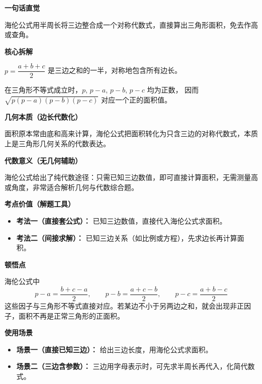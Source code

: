 \begin{explanationbox}
	\textbf{\textcolor{CExplanation}{一句话直觉}}

	海伦公式用半周长将三边整合成一个对称代数式，直接算出三角形面积，免去作高或查角。

	\medskip
	\textbf{\textcolor{CExplanation}{核心拆解}}

	\begin{description}[style=nextline, leftmargin=2.8em, labelsep=0.5em, itemsep=0.45em]
		\item[\textbf{要点一（半周长运算）：}]
		      $p = \dfrac{a+b+c}{2}$ 是三边之和的一半，对称地包含所有边长。

		\item[\textbf{要点二（根号乘积）：}]
		      在三角形不等式成立时，$p$, $p-a$, $p-b$, $p-c$ 均为正数，
		      因而 $\sqrt{p(p-a)(p-b)(p-c)}$ 对应一个正的面积值。
	\end{description}

	\medskip
	\textbf{\textcolor{CExplanation}{几何本质（边长代数化）}}

	面积原本常由底和高来计算，海伦公式把面积转化为只含三边的对称代数式，本质上是三角形几何关系的代数表达。

	\medskip
	\textbf{\textcolor{CExplanation}{代数意义（无几何辅助）}}

	海伦公式给出了纯代数途径：只需已知三边数值，即可直接计算面积，无需测量高或角度，非常适合解析几何与代数综合题。

	\medskip
	\textbf{\textcolor{CExplanation}{考点价值（解题工具）}}

	\begin{itemize}[leftmargin=*, itemsep=0.5em, topsep=0.4em]
		\item \textbf{考法一（直接套公式）：} 已知三边数值，直接代入海伦公式求面积。
		\item \textbf{考法二（间接求解）：} 已知三边关系（如比例或方程），先求边长再计算面积。
	\end{itemize}

	\medskip
	\textbf{\textcolor{CExplanation}{顿悟点}}

	海伦公式中
	\[
		p-a = \frac{b+c-a}{2},
		\qquad
		p-b = \frac{a+c-b}{2},
		\qquad
		p-c = \frac{a+b-c}{2}
	\]
	这些因子与三角形不等式直接对应。若某边不小于另两边之和，就会出现非正因子，面积不再是正常三角形的正面积。

	\medskip
	\textbf{\textcolor{CExplanation}{使用场景}}

	\begin{itemize}[leftmargin=*, itemsep=0.5em, topsep=0.4em]
		\item \textbf{场景一（直接已知三边）：} 给出三边长度，用海伦公式求面积。
		\item \textbf{场景二（三边含参数）：} 三边用字母表示时，可先求半周长再代入，化简代数式。
	\end{itemize}
\end{explanationbox}